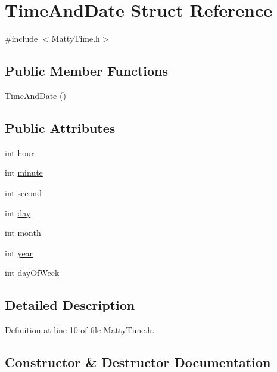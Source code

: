 \hypertarget{structTimeAndDate}{}\section{Time\+And\+Date Struct Reference}
\label{structTimeAndDate}


{\ttfamily \#include $<$Matty\+Time.\+h$>$}

\subsection*{Public Member Functions}
\begin{DoxyCompactItemize}
\item 
\hyperlink{structTimeAndDate_a03bffad876d20f83bc18504e80bc5e7a}{Time\+And\+Date} ()
\end{DoxyCompactItemize}
\subsection*{Public Attributes}
\begin{DoxyCompactItemize}
\item 
int \hyperlink{structTimeAndDate_a4afb76db08eda1b5015ec0dd5dc1e3bb}{hour}
\item 
int \hyperlink{structTimeAndDate_ac6e3bb984cb985e0e41ce66ebf9184d6}{minute}
\item 
int \hyperlink{structTimeAndDate_a33e8f3ab1792ff99e778e5e07dc89a32}{second}
\item 
int \hyperlink{structTimeAndDate_a418a9b58c704cd1c84b442bf708e7c82}{day}
\item 
int \hyperlink{structTimeAndDate_afe5462f6d779ba509ca41af16c75b4d6}{month}
\item 
int \hyperlink{structTimeAndDate_a6acff62930f252e65187b16f559662b9}{year}
\item 
int \hyperlink{structTimeAndDate_a486bfad43c428c9f275e3e887cf8bc52}{day\+Of\+Week}
\end{DoxyCompactItemize}


\subsection{Detailed Description}


Definition at line 10 of file Matty\+Time.\+h.



\subsection{Constructor \& Destructor Documentation}
\hypertarget{structTimeAndDate_a03bffad876d20f83bc18504e80bc5e7a}{}\label{structTimeAndDate_a03bffad876d20f83bc18504e80bc5e7a} 
